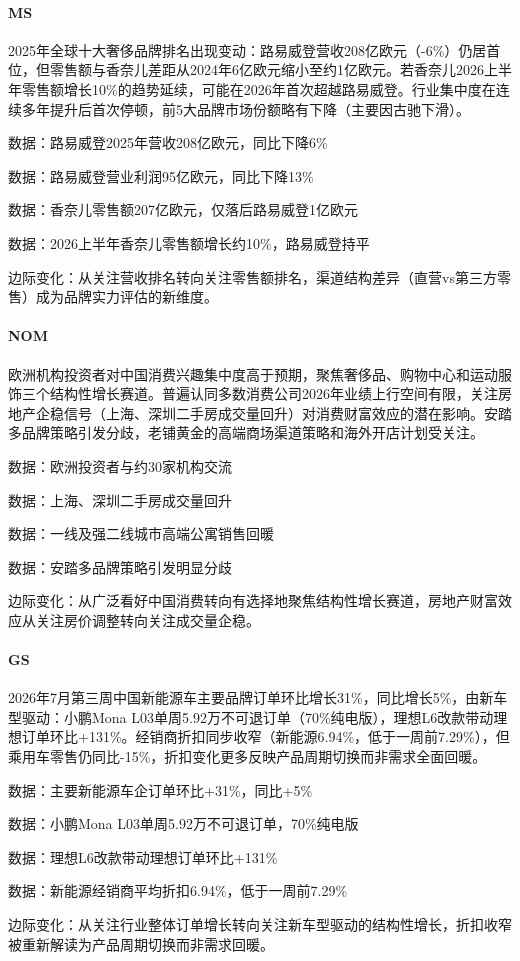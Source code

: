\documentclass[11pt]{ctexart}
\begin{document}
\paragraph{MS} 2025年全球十大奢侈品牌排名出现变动：路易威登营收208亿欧元（-6\%）仍居首位，但零售额与香奈儿差距从2024年6亿欧元缩小至约1亿欧元。若香奈儿2026上半年零售额增长10\%的趋势延续，可能在2026年首次超越路易威登。行业集中度在连续多年提升后首次停顿，前5大品牌市场份额略有下降（主要因古驰下滑）。
{\small\color{refgray}数据：路易威登2025年营收208亿欧元，同比下降6\%\par}
{\small\color{refgray}数据：路易威登营业利润95亿欧元，同比下降13\%\par}
{\small\color{refgray}数据：香奈儿零售额207亿欧元，仅落后路易威登1亿欧元\par}
{\small\color{refgray}数据：2026上半年香奈儿零售额增长约10\%，路易威登持平\par}
{\small\color{refgray}边际变化：从关注营收排名转向关注零售额排名，渠道结构差异（直营vs第三方零售）成为品牌实力评估的新维度。\par}
\paragraph{NOM} 欧洲机构投资者对中国消费兴趣集中度高于预期，聚焦奢侈品、购物中心和运动服饰三个结构性增长赛道。普遍认同多数消费公司2026年业绩上行空间有限，关注房地产企稳信号（上海、深圳二手房成交量回升）对消费财富效应的潜在影响。安踏多品牌策略引发分歧，老铺黄金的高端商场渠道策略和海外开店计划受关注。
{\small\color{refgray}数据：欧洲投资者与约30家机构交流\par}
{\small\color{refgray}数据：上海、深圳二手房成交量回升\par}
{\small\color{refgray}数据：一线及强二线城市高端公寓销售回暖\par}
{\small\color{refgray}数据：安踏多品牌策略引发明显分歧\par}
{\small\color{refgray}边际变化：从广泛看好中国消费转向有选择地聚焦结构性增长赛道，房地产财富效应从关注房价调整转向关注成交量企稳。\par}
\paragraph{GS} 2026年7月第三周中国新能源车主要品牌订单环比增长31\%，同比增长5\%，由新车型驱动：小鹏Mona L03单周5.92万不可退订单（70\%纯电版），理想L6改款带动理想订单环比+131\%。经销商折扣同步收窄（新能源6.94\%，低于一周前7.29\%），但乘用车零售仍同比-15\%，折扣变化更多反映产品周期切换而非需求全面回暖。
{\small\color{refgray}数据：主要新能源车企订单环比+31\%，同比+5\%\par}
{\small\color{refgray}数据：小鹏Mona L03单周5.92万不可退订单，70\%纯电版\par}
{\small\color{refgray}数据：理想L6改款带动理想订单环比+131\%\par}
{\small\color{refgray}数据：新能源经销商平均折扣6.94\%，低于一周前7.29\%\par}
{\small\color{refgray}边际变化：从关注行业整体订单增长转向关注新车型驱动的结构性增长，折扣收窄被重新解读为产品周期切换而非需求回暖。\par}
\end{document}
